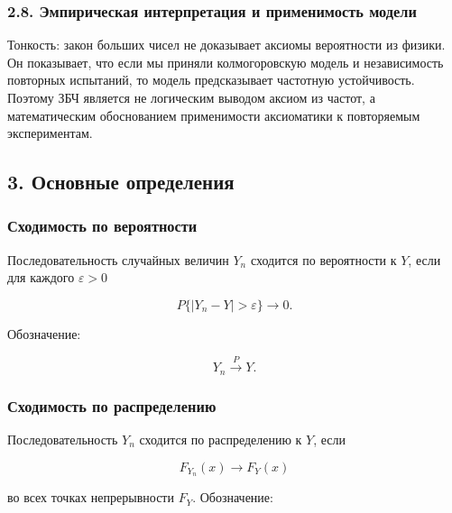 \documentclass[
  11pt,
  a4paper,
]{article}
\begin{document}
\subsubsection{2.8. Эмпирическая интерпретация и применимость
модели}\label{ux44dux43cux43fux438ux440ux438ux447ux435ux441ux43aux430ux44f-ux438ux43dux442ux435ux440ux43fux440ux435ux442ux430ux446ux438ux44f-ux438-ux43fux440ux438ux43cux435ux43dux438ux43cux43eux441ux442ux44c-ux43cux43eux434ux435ux43bux438}

Тонкость: закон больших чисел не доказывает аксиомы вероятности из
физики. Он показывает, что если мы приняли колмогоровскую модель и
независимость повторных испытаний, то модель предсказывает частотную
устойчивость. Поэтому ЗБЧ является не логическим выводом аксиом из
частот, а математическим обоснованием применимости аксиоматики к
повторяемым экспериментам.

\subsection{3. Основные
определения}\label{ux43eux441ux43dux43eux432ux43dux44bux435-ux43eux43fux440ux435ux434ux435ux43bux435ux43dux438ux44f}

\subsubsection{Сходимость по
вероятности}\label{ux441ux445ux43eux434ux438ux43cux43eux441ux442ux44c-ux43fux43e-ux432ux435ux440ux43eux44fux442ux43dux43eux441ux442ux438}

Последовательность случайных величин \(Y_n\) сходится по вероятности к
\(Y\), если для каждого \(\varepsilon>0\)

\[
P\{|Y_n-Y|>\varepsilon\}\to0.
\]

Обозначение:

\[
Y_n\xrightarrow{P}Y.
\]

\subsubsection{Сходимость по
распределению}\label{ux441ux445ux43eux434ux438ux43cux43eux441ux442ux44c-ux43fux43e-ux440ux430ux441ux43fux440ux435ux434ux435ux43bux435ux43dux438ux44e}

Последовательность \(Y_n\) сходится по распределению к \(Y\), если

\[
F_{Y_n}(x)\to F_Y(x)
\]

во всех точках непрерывности \(F_Y\). Обозначение:
\end{document}
